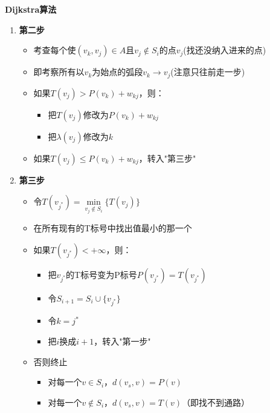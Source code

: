 \begin{thmbox}{\textbf{Dijkstra算法}}{}
\begin{itemize}
\begin{enumerate}[label=\textbf{步骤 \arabic*：}, leftmargin=*]
			\item \textbf{第二步}
			\begin{itemize}
				\item 考查每个使$(v_k,v_j) \in A$且$v_j \notin S_i$的点$v_j$(找还没纳入进来的点)
				\item 即考察所有以$v_k$为始点的弧段$v_k \to v_j$(注意只往前走一步)
				\item 如果$T(v_j) > P(v_k) + w_{kj}$，则：
				\begin{itemize}
					\item 把$T(v_j)$修改为$P(v_k) + w_{kj}$
					\item 把$\lambda(v_j)$修改为$k$
				\end{itemize}
				\item 如果$T(v_j) \leq P(v_k) + w_{kj}$，转入"第三步"
			\end{itemize}
			
			\item \textbf{第三步}
			\begin{itemize}
				\item 令$T(v_{j^*}) = \min\limits_{v_j \notin S_i} \{T(v_j)\}$
				\item 在所有现有的T标号中找出值最小的那一个
				\item 如果$T(v_{j^*}) < +\infty$，则：
				\begin{itemize}
					\item 把$v_{j^*}$的T标号变为P标号$P(v_{j^*}) = T(v_{j^*})$
					\item 令$S_{i+1} = S_i \cup \{v_{j^*}\}$
					\item 令$k = j^*$
					\item 把$i$换成$i+1$，转入"第一步"
				\end{itemize}
				\item 否则终止
				\begin{itemize}
					\item 对每一个$v \in S_i$，$d(v_s,v) = P(v)$
					\item 对每一个$v \notin S_i$，$d(v_s,v) = T(v)$（即找不到通路）
				\end{itemize}
			\end{itemize}
		\end{enumerate}
	\end{itemize}
	\end{thmbox}
